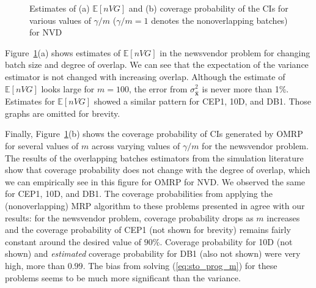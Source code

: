 \documentclass[12pt]{article}
\newcommand{\e}[1]{\mathbb{E} \left[ #1 \right]
}
\newcommand{\x}{\mathbf{x}}
\newcommand{\xh}{{\hat{\x}}}
\begin{document}
\begin{figure}[htb!]
	\centering
	\caption{ 
		Estimates of
		(a) $\e{nVG}$ and 
		(b) coverage probability of the CIs for various values of $\gamma/m$ ($\gamma/m=1$ denotes the nonoverlapping batches)
		 for NVD
	}
\label{fig:nv}
\end{figure}


Figure~\ref{fig:nv}(a) shows estimates of $\e{nVG}$ in the newsvendor problem for changing batch size and degree of overlap. 
We can see that the expectation of the variance estimator is not changed with increasing overlap. 
Although the estimate of $\e{nVG}$ looks large for $m=100$, the error from $\sigma^2_\xh$ is never more than 1\%.  
Estimates for $\e{nVG}$ showed a similar pattern for CEP1, 10D, and DB1.  
Those graphs are omitted for brevity.

Finally, Figure~\ref{fig:nv}(b) shows the coverage probability of CIs generated by OMRP for several values of $m$ across varying values of $\gamma/m$ for the newsvendor problem.  
The results of the overlapping batches estimators from the simulation literature show that coverage probability does not change with the degree of overlap, which we can  empirically see in this figure for OMRP for NVD.
We observed the same for CEP1, 10D, and DB1.  
The coverage probabilities from applying the (nonoverlapping) MRP algorithm to these problems presented in \citep{Bayraksan2006} agree with our results: for the newsvendor problem, coverage probability drops as $m$ increases and the coverage probability of CEP1 (not shown for brevity) remains fairly constant around the desired value of $90\%$. 
Coverage probability for 10D (not shown) and {\it estimated} coverage probability for DB1 (also not shown) were very high, more than $0.99$.  
The bias from solving (\ref{eq:sto_prog_m}) for these problems seems to be much more significant than the variance.
\end{document}
